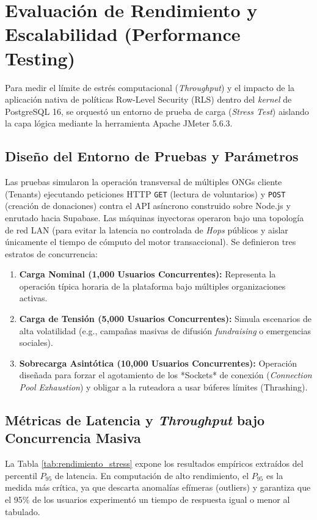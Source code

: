\section{Evaluaci\'on de Rendimiento y Escalabilidad (Performance Testing)}

Para medir el l\'imite de estr\'es computacional (\textit{Throughput}) y el impacto de la aplicaci\'on nativa de pol\'iticas Row-Level Security (RLS) dentro del \textit{kernel} de PostgreSQL 16, se orquest\'o un entorno de prueba de carga (\textit{Stress Test}) aislando la capa l\'ogica mediante la herramienta Apache JMeter 5.6.3.

\subsection{Dise\~no del Entorno de Pruebas y Par\'ametros}
Las pruebas simularon la operaci\'on transversal de m\'ultiples ONGs cliente (Tenants) ejecutando peticiones HTTP \texttt{GET} (lectura de voluntarios) y \texttt{POST} (creaci\'on de donaciones) contra el API as\'incrono construido sobre Node.js y enrutado hacia Supabase. Las m\'aquinas inyectoras operaron bajo una topolog\'ia de red LAN (para evitar la latencia no controlada de \textit{Hops} p\'ublicos y aislar \'unicamente el tiempo de c\'omputo del motor transaccional).
Se definieron tres estratos de concurrencia:
\begin{enumerate}
    \item \textbf{Carga Nominal (1,000 Usuarios Concurrentes):} Representa la operaci\'on t\'ipica horaria de la plataforma bajo m\'ultiples organizaciones activas.
    \item \textbf{Carga de Tensi\'on (5,000 Usuarios Concurrentes):} Simula escenarios de alta volatilidad (e.g., campa\~nas masivas de difusi\'on \textit{fundraising} o emergencias sociales).
    \item \textbf{Sobrecarga Asint\'otica (10,000 Usuarios Concurrentes):} Operaci\'on dise\~nada para forzar el agotamiento de los *Sockets* de conexi\'on (\textit{Connection Pool Exhaustion}) y obligar a la ruteadora a usar b\'uferes l\'imites (Thrashing).
\end{enumerate}

\subsection{M\'etricas de Latencia y \textit{Throughput} bajo Concurrencia Masiva}
La Tabla \ref{tab:rendimiento_stress} expone los resultados emp\'iricos extra\'idos del percentil $P_{95}$ de latencia. En computaci\'on de alto rendimiento, el $P_{95}$ es la medida m\'as cr\'itica, ya que descarta anomal\'ias ef\'imeras (outliers) y garantiza que el 95\% de los usuarios experiment\'o un tiempo de respuesta igual o menor al tabulado.

